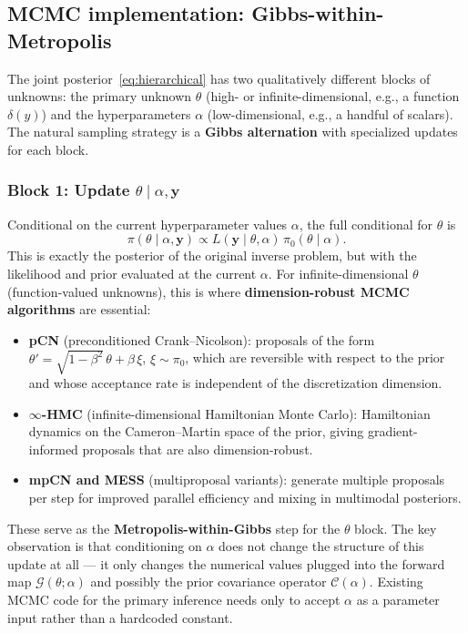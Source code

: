 \documentclass[11pt]{article}
\newcommand{\cG}{\mathcal{G}}
\theoremstyle{plain}
\theoremstyle{remark}
\theoremstyle{definition}
\begin{document}
\subsection{MCMC implementation: Gibbs-within-Metropolis}\label{sec:gibbs}

The joint posterior~\eqref{eq:hierarchical} has two qualitatively different 
blocks of unknowns: the primary unknown $\theta$ (high- or 
infinite-dimensional, e.g., a function $\delta(y)$) and the hyperparameters 
$\alpha$ (low-dimensional, e.g., a handful of scalars). The natural sampling 
strategy is a \textbf{Gibbs alternation} with specialized updates for each 
block.

\subsubsection{Block 1: Update $\theta \mid \alpha, \mathbf{y}$}

Conditional on the current hyperparameter values $\alpha$, the full 
conditional for $\theta$ is
\begin{equation}\label{eq:full_cond_theta}
\pi(\theta \mid \alpha, \mathbf{y}) \propto 
L(\mathbf{y} \mid \theta, \alpha)\,\pi_0(\theta \mid \alpha).
\end{equation}
This is exactly the posterior of the original inverse problem, but with the 
likelihood and prior evaluated at the current $\alpha$. For 
infinite-dimensional $\theta$ (function-valued unknowns), this is where 
\textbf{dimension-robust MCMC algorithms} are essential:
\begin{itemize}
\item \textbf{pCN} (preconditioned Crank--Nicolson): proposals of the form 
  $\theta' = \sqrt{1 - \beta^2}\,\theta + \beta\,\xi$, $\xi \sim \pi_0$, 
  which are reversible with respect to the prior and whose acceptance rate 
  is independent of the discretization dimension.
\item \textbf{$\infty$-HMC} (infinite-dimensional Hamiltonian Monte Carlo): 
  Hamiltonian dynamics on the Cameron--Martin space of the prior, giving 
  gradient-informed proposals that are also dimension-robust.
\item \textbf{mpCN and MESS} (multiproposal variants): generate multiple 
  proposals per step for improved parallel efficiency and mixing in 
  multimodal posteriors.
\end{itemize}
These serve as the \textbf{Metropolis-within-Gibbs} step for the $\theta$ 
block. The key observation is that conditioning on $\alpha$ does not change 
the structure of this update at all --- it only changes the numerical 
values plugged into the forward map $\cG(\theta; \alpha)$ and possibly the 
prior covariance operator $\mathcal{C}(\alpha)$. Existing MCMC code for the 
primary inference needs only to accept $\alpha$ as a parameter input rather 
than a hardcoded constant.
\end{document}

